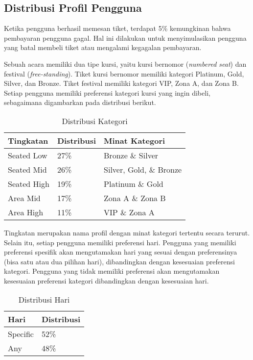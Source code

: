 \subsection{Distribusi Profil Pengguna}

Ketika pengguna berhasil memesan tiket, terdapat 5\% kemungkinan bahwa pembayaran pengguna gagal. Hal ini dilakukan untuk menyimulasikan pengguna yang batal membeli tiket atau mengalami kegagalan pembayaran.

Sebuah acara memiliki dua tipe kursi, yaitu kursi bernomor (\textit{numbered seat}) dan festival (\textit{free-standing}). Tiket kursi bernomor memiliki kategori Platinum, Gold, Silver, dan Bronze. Tiket festival memiliki kategori VIP, Zona A, dan Zona B. Setiap pengguna memiliki preferensi kategori kursi yang ingin dibeli, sebagaimana digambarkan pada distribusi berikut.

\begin{table}[h]
    \centering
    \begin{tabular}{|l|l|l|}
        \hline
        \textbf{Tingkatan} & \textbf{Distribusi} & \textbf{Minat Kategori} \\
        \hline
        Seated Low         & 27\%                & Bronze \& Silver        \\
        \hline
        Seated Mid         & 26\%                & Silver, Gold, \& Bronze \\
        \hline
        Seated High        & 19\%                & Platinum \& Gold        \\
        \hline
        Area Mid           & 17\%                & Zona A \& Zona B        \\
        \hline
        Area High          & 11\%                & VIP \& Zona A           \\
        \hline
    \end{tabular}
    \caption{Distribusi Kategori}
\end{table}

Tingkatan merupakan nama profil dengan minat kategori tertentu secara terurut. Selain itu, setiap pengguna memiliki preferensi hari. Pengguna yang memiliki preferensi spesifik akan mengutamakan hari yang sesuai dengan preferensinya (bisa satu atau dua pilihan hari), dibandingkan dengan kesesuaian preferensi kategori. Pengguna yang tidak memiliki preferensi akan mengutamakan kesesuaian preferensi kategori dibandingkan dengan kesesuaian hari.

\begin{table}[h]
    \centering
    \begin{tabular}{|l|l|}
        \hline
        \textbf{Hari} & \textbf{Distribusi} \\
        \hline
        Specific      & 52\%                \\
        \hline
        Any           & 48\%                \\
        \hline
    \end{tabular}
    \caption{Distribusi Hari}
\end{table}


